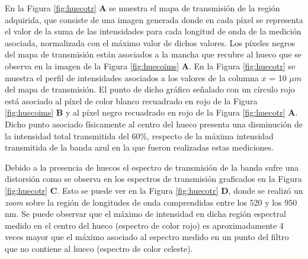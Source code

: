 En la Figura \ref{fig:huecotr} \textbf{A} se muestra el mapa de transmisión de la región adquirida, que consiste de una imagen generada donde en cada píxel se representa el valor de la suma de las intensidades para cada longitud de onda de la medición asociada, normalizada con el máximo valor de dichos valores. Los píxeles negros del mapa de transmisión están asociados a la mancha que recubre al hueco que se observa en la imagen de la Figura \ref{fig:huecoims} \textbf{A}.
En la Figura \ref{fig:huecotr} se muestra el perfil de intensidades asociados a los valores de la columna $\textit{x}$ = 10 $\mu m$ del mapa de transmisión. El punto de dicho gráfico señalado con un círculo rojo está asociado al píxel de color blanco recuadrado en rojo de la Figura \ref{fig:huecoims} \textbf{B} y al píxel negro recuadrado en rojo de la Figura \ref{fig:huecotr} \textbf{A}. Dicho punto asociado físicamente al centro del hueco presenta una disminución de la intensidad total transmitida del 60\%, respecto de la máxima intensidad transmitida de la banda azul en la que fueron realizadas estas mediciones.

Debido a la presencia de huecos el espectro de transmisión de la banda sufre una distorsión como se observa en los espectros de transmisión graficados en la Figura \ref{fig:huecotr} \textbf{C}. Esto se puede ver en la Figura \ref{fig:huecotr} \textbf{D}, donde se realizó un \textit{zoom} sobre la región de longitudes de onda comprendidas entre los 520 y los 950 nm. Se puede observar que el máximo de intensidad en dicha región espectral medido en el centro del hueco (espectro de color rojo) es aproximadamente 4 veces mayor que el máximo asociado al espectro medido en un punto del filtro que no contiene al hueco (espectro de color celeste).

